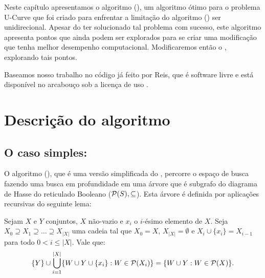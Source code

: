 Neste capítulo apresentamos o algoritmo  
(), um algoritmo ótimo para o problema U-Curve que foi 
criado para enfrentar a limitação do algoritmo  () ser unidirecional. Apesar do 
ter solucionado tal problema com sucesso, este algoritmo apresenta 
pontos que ainda podem ser explorados para se criar uma modificação que
tenha melhor desempenho computacional. Modificaremos então o 
, explorando tais pontos.

Baseamos nosso trabalho no código já feito por Reis, que é software 
livre e está disponível no arcabouço  \cite{Reis+17} 
sob a licença de uso .

\section{Descrição do algoritmo}

\subsection{O caso simples: }
O algoritmo  (), que é 
uma versão simplificada do , percorre o espaço de busca 
fazendo uma busca em profundidade em uma árvore que é subgrafo do 
diagrama de Hasse do reticulado Booleano ($\mathcal{P} (S), \subseteq$). 
Esta árvore é definida por aplicações recursivas do seguinte lema:

\begin{mylemma}
\label{lemma:lower_forest}
Sejam $X$ e $Y$ conjuntos, $X$ não-vazio e $x_i$ o $i$-ésimo 
elemento de $X$. Seja $X_0 \supseteq X_1 \supseteq \dots \supseteq 
X_{|X|}$ uma cadeia tal que $X_0 = X$, $X_{|X|} = \emptyset$ e $X_{i} 
\cup \{x_i\} = X_{i - 1}$ para todo $0 < i \leq |X|$. Vale que:
\begin{align*}
\{ Y \} \cup \bigcup_{i = 1}^{|X|} \{W \cup Y \cup \{x_i\} : W \in \mathcal{P} (X_i)\} = \{W \cup Y : W \in \mathcal{P} (X)\}.
\end{align*}
\end{mylemma} 

